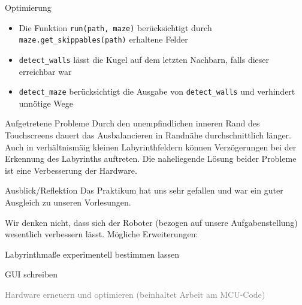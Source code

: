 \documentclass{beamer}
\begin{document}
\begin{frame}[fragile,t]{Optimierung}
\begin{itemize}
\item Die Funktion \verb~run(path, maze)~ berücksichtigt durch \verb~maze.get_skippables(path)~ erhaltene Felder
\item \verb~detect_walls~ lässt die Kugel auf dem letzten Nachbarn, falls dieser erreichbar war
\item \verb~detect_maze~ berücksichtigt die Ausgabe von \verb~detect_walls~ und verhindert unnötige Wege
\end{itemize}
\end{frame}

\begin{frame}[fragile,t]{Aufgetretene Probleme}
Durch den unempfindlichen inneren Rand des Touchscreens dauert das Ausbalancieren in Randnähe durchschnittlich länger. Auch in verhältnismäig kleinen Labyrinthfeldern können Verzögerungen bei der Erkennung des Labyrinths auftreten. Die naheliegende Lösung beider Probleme ist eine Verbesserung der Hardware.
\end{frame}

\begin{frame}[fragile,t]{Ausblick/Reflektion}
Das Praktikum hat uns sehr gefallen und war ein guter Ausgleich zu unseren Vorlesungen.

\medskip\noindent
Wir denken nicht, dass sich der Roboter (bezogen auf unsere Aufgabenstellung) wesentlich verbessern lässt. Mögliche Erweiterungen:
\begin{itemize}
\item Labyrinthmaße experimentell bestimmen lassen
\item GUI schreiben
\textcolor{gray}{
\item[\textcolor{gray}{$\triangleright$}] Hardware erneuern und optimieren (beinhaltet Arbeit am MCU-Code)
}
\end{itemize}
\end{frame}


\end{document}
